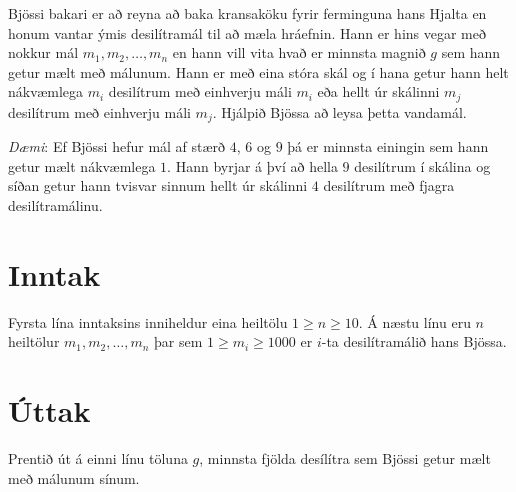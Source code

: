 
Bjössi bakari er að reyna að baka kransaköku fyrir ferminguna hans Hjalta en
honum vantar ýmis desilítramál til að mæla hráefnin. Hann er hins vegar með
nokkur mál $m_1,m_2,\ldots,m_n$ en hann vill vita hvað er minnsta magnið $g$
sem hann getur mælt með málunum. Hann er með eina stóra skál og í hana getur
hann helt nákvæmlega $m_i$ desilítrum með einhverju máli $m_i$ eða hellt úr
skálinni $m_j$ desilítrum með einhverju máli $m_j$. Hjálpið Bjössa að leysa
þetta vandamál.

\emph{Dæmi}: Ef Bjössi hefur mál af stærð $4$, $6$ og $9$ þá er minnsta
einingin sem hann getur mælt nákvæmlega $1$. Hann byrjar á því að hella $9$
desilítrum í skálina og síðan getur hann tvisvar sinnum hellt úr skálinni $4$
desilítrum með fjagra desilítramálinu.

\section*{Inntak}
Fyrsta lína inntaksins inniheldur eina heiltölu $1 \geq n \geq 10$. Á næstu línu eru $n$
heiltölur $m_1,m_2,\ldots,m_n$ þar sem $1 \geq m_i \geq 1000$ er $i$-ta desilítramálið hans
Bjössa.

\section*{Úttak}
Prentið út á einni línu töluna $g$, minnsta fjölda desílítra sem Bjössi getur
mælt með málunum sínum.
